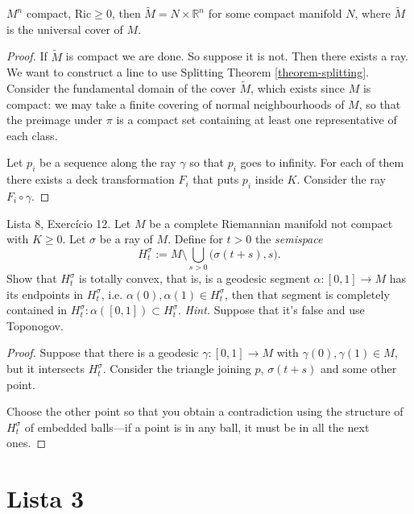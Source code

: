 \documentclass{book}
\begin{document}
\begin{exercise}
\label{exercise-product-of-compact-and-Rn}
$M^n$ compact, $\text{Ric} \geq 0$, then
$\tilde{M}=N \times \mathbb{R}^n$ for
some compact manifold $N$, where  $\tilde{M}$
is
the universal cover of $M$.
\end{exercise}

\begin{proof}
If $\tilde{M}$ is compact we are done.
So suppose it is not.
Then there exists a
ray. We want to construct
a line to use Splitting Theorem
\ref{theorem-splitting}.
Consider the fundamental domain of the cover
$\tilde{M}$,
which exists since
$M$ is compact: we may take a finite covering
of normal neighbourhoods of $M$,
so that the preimage under $\pi$ is a compact
set containing at least one
representative of each class.

Let $p_i$ be a sequence along the ray
$\gamma$
so that $p_i$ goes to infinity.
For each of them there exists a
deck transformation $F_i$ that puts $p_i$
inside
$K$. Consider the ray $F_i \circ \gamma$.
\end{proof}

\begin{exercise}
\label{exercise-rays-semispaces}
Lista 8, Exercício 12. Let $M$ be a complete
Riemannian manifold not compact
with $K \geq 0$. Let $\sigma$ be a ray of
$M$. Define for $t>0$ the {\it
semispace}
$$
H_t^{\sigma}:=M\setminus
\bigcup_{s>0}\Big(\sigma(t+s),s).
$$
Show that $H_t^{\sigma}$ is totally convex,
that is, is a geodesic segment
 $\alpha:[0,1]\to M$ has its endpoints in
 $H_t^{\sigma}$, i.e.
$\alpha(0),\alpha(1) \in H_t^{\sigma}$, then
that segment is completely
contained in $H_t^{\sigma}:\alpha([0,1])
\subset H_t^{\sigma}$. {\it Hint.}
Suppose that it's false and use Toponogov.
\end{exercise}

\begin{proof}
Suppose that there is a geodesic
$\gamma:[0,1]\to M$ with $\gamma(0),\gamma(1)
\in M$, but it intersects $H_t^{\sigma}$.
Consider the triangle joining $p$,
$\sigma(t+s)$ and some other point.

Choose the other point so that you obtain a
contradiction using the structure of
$H_t^{\sigma}$ of embedded balls---if a point
is in any ball, it must be in all
the next ones.
\end{proof}

\section{Lista 3}
\label{section-lista-3}
\end{document}
